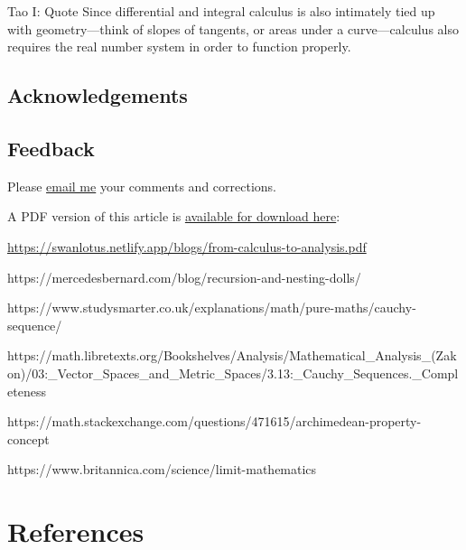 \documentclass[
  a4paper,
]{article}
\begin{document}
Tao I: Quote Since differential and integral calculus is also intimately
tied up with geometry---think of slopes of tangents, or areas under a
curve---calculus also requires the real number system in order to
function properly.

\subsection{Acknowledgements}\label{acknowledgements}

\subsection{Feedback}\label{feedback}

Please \href{mailto:feedback.swanlotus@gmail.com}{email me} your
comments and corrections.

\noindent A PDF version of this article is
\href{./from-calculus-to-analysis.pdf}{available for download here}:

\begin{small}

\begin{sffamily}

\url{https://swanlotus.netlify.app/blogs/from-calculus-to-analysis.pdf}

\end{sffamily}

\end{small}

https://mercedesbernard.com/blog/recursion-and-nesting-dolls/

https://www.studysmarter.co.uk/explanations/math/pure-maths/cauchy-sequence/

https://math.libretexts.org/Bookshelves/Analysis/Mathematical\_Analysis\_(Zakon)/03:\_Vector\_Spaces\_and\_Metric\_Spaces/3.13:\_Cauchy\_Sequences.\_Completeness

https://math.stackexchange.com/questions/471615/archimedean-property-concept

https://www.britannica.com/science/limit-mathematics

\section*{References}\label{bibliography}
\end{document}
